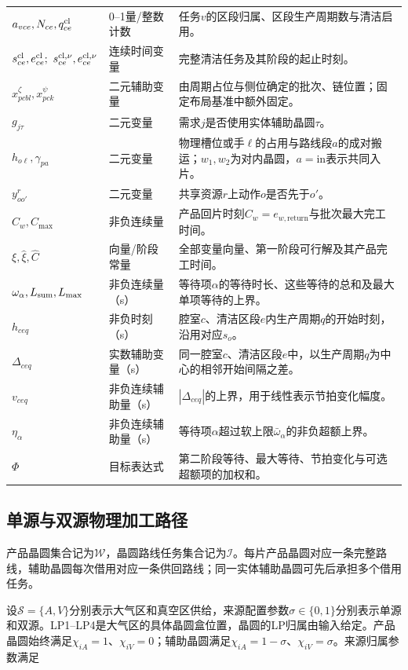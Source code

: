 \documentclass[final,5p,times,twocolumn]{elsarticle}
\begin{document}
\begin{table}[t]
\begin{tabular}{C{0.20\textwidth}C{0.16\textwidth}C{0.43\textwidth}}
$a_{vce},N_{ce},q^{\rm cl}_{ce}$ & 0--1量/整数计数 & 任务$v$的区段归属、区段生产周期数与清洁启用。\\
$s^{\rm cl}_{ce},e^{\rm cl}_{ce};\ s^{\rm cl,\nu}_{ce},e^{\rm cl,\nu}_{ce}$ & 连续时间变量 & 完整清洁任务及其阶段的起止时刻。\\
$x^{\zeta}_{pcbl},x^{\psi}_{pck}$ & 二元辅助变量 & 由周期占位与侧位确定的批次、链位置；固定布局基准中额外固定。\\
$g_{j\tau}$ & 二元变量 & 需求$j$是否使用实体辅助晶圆$\tau$。\\
$h_{o\ell},\gamma_{pa}$ & 二元变量 & 物理槽位或手$\ell$的占用与路线段$a$的成对搬运；$w_1,w_2$为对内晶圆，$a=\mathrm{in}$表示共同入片。\\
$y^r_{oo'}$ & 二元变量 & 共享资源$r$上动作$o$是否先于$o'$。\\
$C_w,C_{\max}$ & 非负连续量 & 产品回片时刻$C_w=e_{w,\mathrm{return}}$与批次最大完工时间。\\
$\xi,\widehat\xi,\widehat C$ & 向量/阶段常量 & 全部变量向量、第一阶段可行解及其产品完工时间。\\
$\omega_\alpha,L_{\rm sum},L_{\max}$ & 非负连续量（s） & 等待项$\alpha$的等待时长、这些等待的总和及最大单项等待的上界。\\
$h_{ceq}$ & 非负时刻（s） & 腔室$c$、清洁区段$e$内生产周期$q$的开始时刻，沿用对应$s_o$。\\
$\Delta_{ceq}$ & 实数辅助变量（s） & 同一腔室$c$、清洁区段$e$中，以生产周期$q$为中心的相邻开始间隔之差。\\
$v_{ceq}$ & 非负连续辅助量（s） & $|\Delta_{ceq}|$的上界，用于线性表示节拍变化幅度。\\
$\eta_\alpha$ & 非负连续辅助量（s） & 等待项$\alpha$超过软上限$\bar\omega_\alpha$的非负超额上界。\\
$\Phi$ & 目标表达式 & 第二阶段等待、最大等待、节拍变化与可选超额项的加权和。\\
\bottomrule
\end{tabular}
\end{table}

\subsection{单源与双源物理加工路径}
\label{sec:model-path-cn}

产品晶圆集合记为$\mathcal W$，晶圆路线任务集合记为$\mathcal I$。每片产品晶圆对应一条完整路线，辅助晶圆每次借用对应一条供回路线；同一实体辅助晶圆可先后承担多个借用任务。

设$\mathcal S=\{A,V\}$分别表示大气区和真空区供给，来源配置参数$\sigma\in\{0,1\}$分别表示单源和双源。LP1--LP4是大气区的具体晶圆盒位置，晶圆的LP归属由输入给定。产品晶圆始终满足$\chi_{iA}=1$、$\chi_{iV}=0$；辅助晶圆满足$\chi_{iA}=1-\sigma$、$\chi_{iV}=\sigma$。来源归属参数满足
\end{document}
